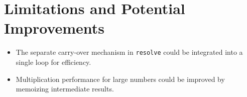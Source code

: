 \documentclass[a4paper,12pt]{article}
\begin{document}
\section{Limitations and Potential Improvements}
\begin{itemize}
    \item The separate carry-over mechanism in \texttt{resolve} could be integrated into a single loop for efficiency.
    \item Multiplication performance for large numbers could be improved by memoizing intermediate results.
\end{itemize}
\end{document}
